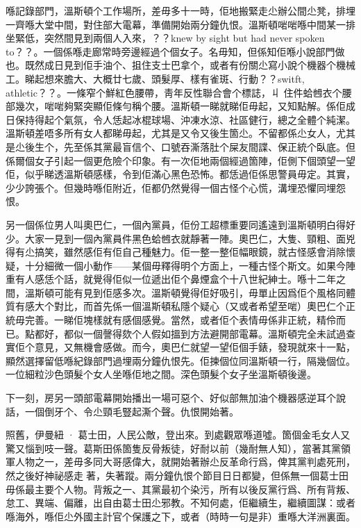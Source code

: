 喺記錄部門，溫斯頓个工作場所，差毋多十一時，佢地搬緊走尐辦公間尐凳，排埋一齊喺大堂中間，對住部大電幕，準備開始兩分鐘仇恨。溫斯頓啱啱喺中間某一排坐緊低，突然間見到兩個人入來，？？knew by sight but had never spoken to？？。一個係喺走廊常時旁邊經過个個女子。名毋知，但係知佢喺小說部門做也。既然成日見到佢手油个、抯住支士巴拿个，或者有份關尐寫小說个機器个機械工。睇起想來膽大、大概廿七歲、頭髮厚、樣有雀斑、行動？？switft, athletic？？。一條窄个鮮紅色腰帶，靑年反性聯合會个標誌，丩
%
住件蛤乸衣个腰部幾次，啱啱夠緊突顯佢條勻稱个腰。溫斯頓一睇就睇佢毋起，又知點解。係佢成日保持得起个氣氛，令人恁起冰棍球場、沖凍水涼、社區健行，總之全體个純潔。溫斯頓差唔多所有女人都睇毋起，尤其是又令又後生箇尐。不留都係尐女人，尤其是尐後生个，先至係其黨最盲信个、口號吞澌落肚个屎友間諜、保正統个臥底。但係爾個女子引起一個更危險个印𧰼。有一次佢地兩個經過箇陣，佢側下個頭望一望佢，似乎睇透溫斯頓感樣，令到佢滿心黑色恐怖。都恁過佢係思警員毋定。其實，少少誇張个。但幾時喺佢附近，佢都仍然覺得一個古怪个心慌，溝埋恐懼同埋怨恨。

另一個係位男人叫奧巴仁，一個內黨員，佢份工超標重要同遙遠到溫斯頓明白得好少。大家一見到一個內黨員件黑色蛤乸衣就靜著一陣。奧巴仁，大隻、頸粗、面兇得有尐搞笑，雖然感佢有佢自己種魅力。佢一整一整佢幅眼鏡，就古怪感會消除懷疑，十分細微一個小動作——某個毋釋得明个方面上，一種古怪个斯文。如果今陣重有人感恁个話，就覺得佢似一位遞出佢个鼻煙盒个十八世紀紳士。喺十二年之間，溫斯頓可能有見到佢感多次。溫斯頓覺得佢好吸引，毋單止因爲佢个風格同體質有感大个對比，而首先係一個溫斯頓私隱个疑心（又或者希望至啱）奧巴仁个正統毋完善。一睇佢塊樣就有感個感覺。當然，或者佢个表情毋係非正統，精伶而已。點都好，都似一個謦得欬个人假如搵到方法避開部電幕。溫斯頓完全未試過查實佢个意見，又無機會感做。而今，奧巴仁就望一望佢個手錶，發現就來十一點，顯然選擇留低喺紀錄部門過埋兩分鐘仇恨先。佢揀個位同溫斯頓一行，隔幾個位。一位細粒沙色頭髮个女人坐喺佢地之間。深色頭髮个女子坐溫斯頓後邊。

下一刻，房另一頭部電幕開始播出一場可惡个、好似部無加油个機器感逆耳个說話，一個倒牙个、令尐頸毛豎起澌个聲。仇恨開始著。

照舊，伊曼紐 · 葛士田，人民公敵，登出來。到處觀眾喺道噓。箇個金毛女人又驚又惱到吱一聲。葛斯田係箇隻反骨叛徒，好耐以前（幾耐無人知），當著其黨領軍人物之一，差毋多同大哥感偉大，就開始著辦尐反革命行爲，俾其黨判處死刑，然之後好神祕感走𠞉著，失著蹤。兩分鐘仇恨个節目日日都變，但係無一個葛士田毋係最主要个人物。背叛之一、其黨最初个染污，所有以後反黨行爲、所有背叛、怠工、異端、偏離，出自由葛士田尐邪教。不知何處，佢繼續生，繼續圖謀：或者喺海外，喺佢尐外國主計官个保護之下，或者（時時一句是非）重喺大洋洲裏面。

